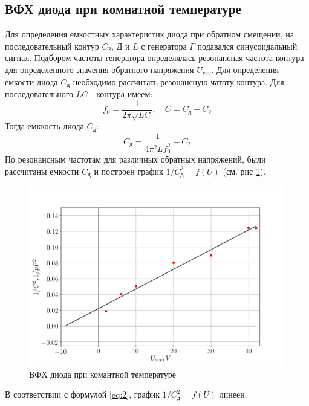 \subsection{ВФХ диода при комнатной температуре}
Для определения емкостных характеристик диода при обратном смещении, на последовательный контур $C_2$, Д и $L$ с
генератора $\Gamma$ подавался синусоидальный сигнал. Подбором частоты генератора определялась резонансная частота
контура для определенного значения обратного напряжения $U_{rev}$. Для определения емкости диода $C_{\text{д}}$
необходимо рассчитать резонансную чатоту контура. Для последовательного $LC$ - контура имеем:
\begin{equation}
	f_0 = \frac{1}{2 \pi \sqrt{L C}}, \quad C = C_{\text{д}} + C_2
	\label{eq:flc}
\end{equation}
Тогда емккость диода $C_{\text{д}}$:
\begin{equation}
	C_{\text{д}} = \frac{1}{4 \pi^2 L f_0^2} - C_2
	\label{eq:cd}
\end{equation}
По резонансным частотам для различных обратных напряжений, были рассчитаны емкости $C_{\text{д}}$ и построен график
$1/C_{\text{д}}^2 = f(U)$ (см. рис \ref{fig:vfh}).
\begin{figure}[h!]
    \centering
    \includegraphics[width = 0.7\linewidth]{imgs/vfh.png}
    \caption{ВФХ диода при комантной температуре}
    \label{fig:vfh}
\end{figure}
В соответствии с формулой \ref{eq:2}, график $1/C_{\text{д}}^2 = f(U)$ линеен.
